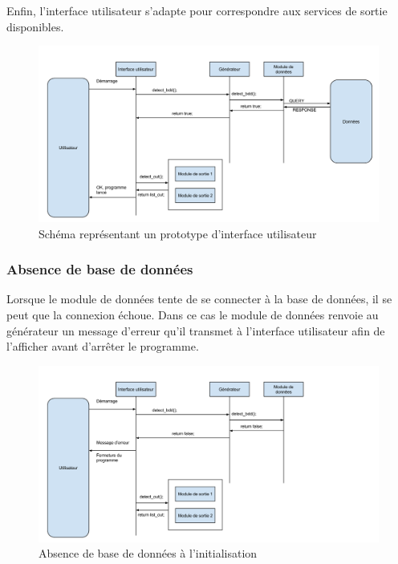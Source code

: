 \documentclass[11pt,a4paper]{article}
\begin{document}
Enfin, l'interface utilisateur s'adapte pour correspondre aux services de sortie
disponibles.
        
\begin{figure}[!h]
\includegraphics[width=14cm]{demarrage_fonctionnel.png}
\caption{Schéma représentant un prototype d'interface utilisateur}          
\end{figure}
        
\subsubsection{Absence de base de données}
        
Lorsque le module de données tente de se connecter à la base de données, il se
peut que la connexion échoue. Dans ce cas le module de données renvoie au
générateur un message d'erreur qu'il transmet à l'interface utilisateur afin de
l'afficher avant d'arrêter le programme.
        
\begin{figure}[!h]
\includegraphics[width=14cm]{demarrage_absence_bdd.png}
\caption{Absence de base de données à l'initialisation}
\end{figure}
        
\end{document}

